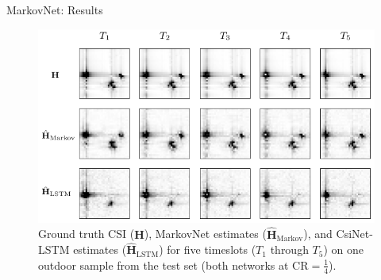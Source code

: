 \documentclass{beamer}
\begin{document}
  \begin{frame}{MarkovNet: Results}
    \begin{figure}[htb] \centering 
      \includegraphics[width=0.9\linewidth]{batch0_csi_compare_cr512.pdf}
      \caption{Ground truth CSI ($\mathbf H$), MarkovNet estimates ($\hat{\mathbf H}_{\text{Markov}}$), and CsiNet-LSTM estimates ($\hat{\mathbf H}_{\text{LSTM}}$) for five timeslots ($T_1$ through $T_5$) on one outdoor sample from the test set (both networks at $\text{CR}=\frac 14$).} 
      \label{fig:csi_img_compare} 
    \end{figure}
  \end{frame}
\end{document}
